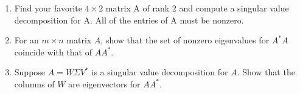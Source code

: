 \documentclass{article}
\begin{document}
\begin{enumerate}
\item Find your favorite $4 \times  2$ matrix A of rank 2 and compute a singular value decomposition for A. All of the entries of A must be nonzero.

\item For an $m \times  n$ matrix $A$, show that the set of nonzero eigenvalues for $A^*  A$ coincide with that of $AA^* $.

\item Suppose $A = W \Sigma V^* $ is a singular value decomposition for $A$. Show that the columns of $W$ are eigenvectors for $AA^* $.

\end{enumerate}
\end{document}
